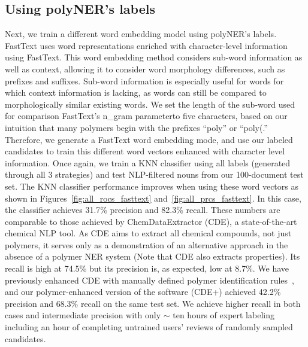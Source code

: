 \subsection{Using polyNER's labels}
Next, we train a different word embedding model using polyNER's labels.
FastText uses word representations enriched with character-level information using FastText.
This word embedding method considers sub-word information as well as
context, allowing it to consider word morphology differences, such as prefixes
and suffixes. Sub-word information is especially useful for words for which
context information is lacking, as words can still be compared to morphologically similar
existing words. We set the length of the sub-word used for comparison\textemdash
FastText's n_gram parameter\textemdash to five characters, based on our intuition that
many polymers begin with the prefixes ``poly'' or ``poly(.'' \\

Therefore, we generate a FastText word embedding mode, and use our labeled candidates to train this different word vectors enhanced with character level information.
Once again, we train a KNN classifier using all labels (generated through all 3 strategies)
 and test NLP-filtered nouns from our 100-document test set.
The KNN classifier performance improves when using these word vectors as shown in Figures~\ref{fig:all_rocs_fasttext} and~\ref{fig:all_prcs_fasttext}.
In this case, the classifier achieves 31.7\% precision and 82.3\% recall. 
These numbers are comparable to those achieved by ChemDataExtractor (CDE), a state-of-the-art chemical NLP tool.
As CDE aims to extract all
chemical compounds, not just polymers, it serves only as a demonstration of an
alternative approach in the absence of a polymer NER system (Note that CDE also extracts properties). 
Its recall is high
at 74.5\% but its precision is, as expected, low at 8.7\%. 
We have previously enhanced CDE with
manually defined polymer identification rules~\cite{tchoua2017towards},
and our polymer-enhanced version of the software (CDE+) achieved 42.2\% precision and 68.3\% recall on the same test set. 
We achieve higher recall in both cases and intermediate precision with only $\sim$ ten hours of expert labeling including an hour of completing untrained users' reviews of randomly sampled candidates.

